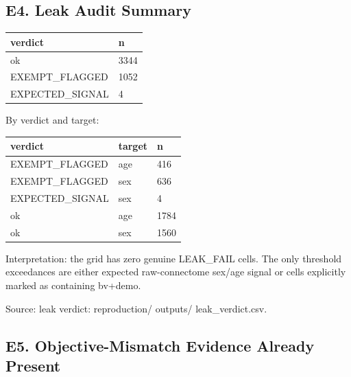 \subsection{E4. Leak Audit Summary}\label{e4-leak-audit-summary}

{\def\LTcaptype{none} %
\begin{longtable}[]{@{}ll@{}}
\toprule\noalign{}
verdict & n \\
\midrule\noalign{}
\endhead
\bottomrule\noalign{}
\endlastfoot
ok & 3344 \\
EXEMPT\_FLAGGED & 1052 \\
EXPECTED\_SIGNAL & 4 \\
\end{longtable}
}

By verdict and target:

{\def\LTcaptype{none} %
\begin{longtable}[]{@{}lll@{}}
\toprule\noalign{}
verdict & target & n \\
\midrule\noalign{}
\endhead
\bottomrule\noalign{}
\endlastfoot
EXEMPT\_FLAGGED & age & 416 \\
EXEMPT\_FLAGGED & sex & 636 \\
EXPECTED\_SIGNAL & sex & 4 \\
ok & age & 1784 \\
ok & sex & 1560 \\
\end{longtable}
}

Interpretation: the grid has zero genuine LEAK\_FAIL cells. The only threshold exceedances are either expected raw-connectome sex/age signal or cells explicitly marked as containing bv+demo.

Source: leak verdict: reproduction/ outputs/ leak\_verdict.csv.

\subsection{E5. Objective-Mismatch Evidence Already Present}\label{e5-objective-mismatch-evidence-already-present}

